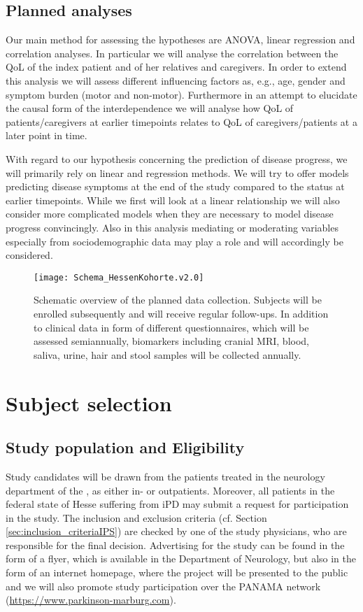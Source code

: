 \subsection{Planned analyses}
Our main method for assessing the hypotheses are \ac{ANOVA}, linear regression and correlation analyses. In particular we will analyse the correlation between the \ac{QoL} of the index patient and of her relatives and caregivers. In order to extend this analysis we will assess different influencing factors as, e.g., age, gender and symptom burden (motor and non-motor). Furthermore in an attempt to elucidate the causal form of the interdependence we will analyse how \ac{QoL} of patients/caregivers at earlier timepoints relates to \ac{QoL} of caregivers/patients at a later point in time.

With regard to our hypothesis concerning the prediction of disease progress, we will primarily rely on linear and regression methods. We will try to offer models predicting disease symptoms at the end of the study compared to the status at earlier timepoints. While we first will look at a linear relationship we will also consider more complicated models when they are necessary to model disease progress convincingly. Also in this analysis mediating or moderating variables especially from sociodemographic data may play a role and will accordingly be considered.

\begin{figure}[h]
\label{fig2:scheme}
\centering
\texttt{[image: Schema\_HessenKohorte.v2.0]}
\caption{Schematic overview of the planned data collection. Subjects will be enrolled subsequently and will receive regular follow-ups. In addition to clinical data in form of different questionnaires, which will be assessed semiannually, biomarkers including cranial \ac{MRI}, blood, saliva, urine, hair and stool samples will be collected annually.}
\end{figure}


\section{Subject selection}
\label{sec:study_selection}
\subsection{Study population and Eligibility}
\label{sec:study_population}
Study candidates will be drawn from the patients treated in the neurology department of the \UKM{}, as either in- or outpatients. Moreover, all patients in the federal state of Hesse suffering from \ac{iPD} may submit a request for participation in the study. The inclusion and exclusion criteria (cf. Section \ref{sec:inclusion_criteriaIPS}) are checked by one of the study physicians, who are responsible for the final decision. Advertising for the study can be found in the form of a flyer, which is available in the Department of Neurology, but also in the form of an internet homepage, where the project will be presented to the public and we will also promote study participation over the \ac{PANAMA} network (\url{https://www.parkinson-marburg.com}).


